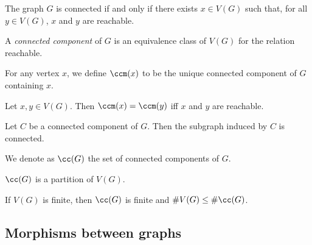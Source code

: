 \begin{lemma}
  \label{lem:connected_iff_exists_forall_reachable}
  The graph $G$ is connected if and only if there exists $x \in V(G)$ such that,
  for all $y \in V(G)$, $x$ and $y$ are reachable.
\end{lemma}

\begin{definition}
  \label{def:connected_component}
  A \emph{connected component} of $G$ is an equivalence class of $V(G)$ for
  the relation reachable.
\end{definition}

\begin{definition}
  \label{def:connected_component_Mk}
  For any vertex $x$, we define $\ccm(x)$ to be the unique connected component
  of $G$ containing $x$.
\end{definition}

\begin{lemma}
  \label{lem:cc_eq}
  Let $x, y \in V(G)$. Then $\ccm(x) = \ccm(y)$ iff $x$ and $y$ are reachable.
\end{lemma}

\begin{theorem}
  \label{thm:cc_is_connected}
  Let $C$ be a connected component of $G$. Then the subgraph induced by $C$ is connected.
\end{theorem}

\begin{definition}
  \label{def:set_cc}
  We denote as $\cc(G)$ the set of connected components of $G$.
\end{definition}

\begin{proposition}
  \label{prop:cc_is_partition}
  $\cc(G)$ is a partition of $V(G)$.
\end{proposition}

\begin{lemma}
  \label{lem:bound_cc}
  If $V(G)$ is finite, then $\cc(G)$ is finite and $\#V(G) \leq \# \cc(G)$.
\end{lemma}

\subsection{Morphisms between graphs}

